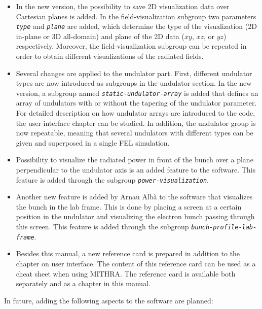 \begin{itemize}
	\item In the new version, the possibility to save 2D visualization data over Cartesian planes is added. In the field-visualization subgroup two parameters {\tt \em \small type} and {\tt \em \small plane} are added, which determine the type of the visualization (2D in-plane or 3D all-domain) and plane of the 2D data ($xy$, $xz$, or $yz$) respectively. Moreover, the field-visualization subgroup can be repeated in order to obtain different visualizations of the radiated fields.
	\item Several changes are applied to the undulator part. First, different undulator types are now introduced as subgroups in the undulator section. In the new version, a subgroup named {\em \tt \small static-undulator-array} is added that defines an array of undulators with or without the tapering of the undulator parameter. For detailed description on how undulator arrays are introduced to the code, the user interface chapter can be studied. In addition, the undulator group is now repeatable, meaning that several undulators with different types can be given and superposed in a single FEL simulation.
	\item Possibility to visualize the radiated power in front of the bunch over a plane perpendicular to the undulator axis is an added feature to the software. This feature is added through the subgroup {\tt \em \small power-visualization}.
	\item Another new feature is added by Arnau Alb\`{a} to the software that visualizes the bunch in the lab frame. This is done by placing a screen at a certain position in the undulator and visualizing the electron bunch passing through this screen. This feature is added through the subgroup {\tt \em \small bunch-profile-lab-frame}.
	\item Besides this manual, a new reference card is prepared in addition to the chapter on user interface. The content of this reference card can be used as a cheat sheet when using MITHRA. The reference card is available both separately and as a chapter in this manual. 
\end{itemize}
%
In future, adding the following aspects to the software are planned:
%
